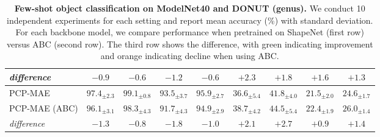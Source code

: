 \begin{table}
\begin{center}
\begin{tabular}{l|cccc|cccc}
\textit{difference} & \cellcolor{orange!25}$-0.9$ & \cellcolor{orange!25}$-0.6$ & \cellcolor{orange!25}$-1.2$ & \cellcolor{orange!25}$-0.6$ & \cellcolor{green!25}$+2.3$ & \cellcolor{green!25}$+1.8$ & \cellcolor{green!25}$+1.6$ & \cellcolor{green!25}$+1.3$ \\
\midrule
PCP-MAE~\cite{pcpmae} & $97.4_{\pm 2.3}$ & $99.1_{\pm 0.8}$ & $93.5_{\pm 3.7}$ & $95.9_{\pm 2.7}$ & $36.6_{\pm 5.4}$ & $41.8_{\pm 4.0}$ & $21.5_{\pm 2.0}$ & $24.6_{\pm 1.7}$\\
PCP-MAE (ABC) & $96.1_{\pm 3.1}$ & $98.3_{\pm 4.3}$ & $91.7_{\pm 4.3}$ & $94.9_{\pm 2.9}$ & $38.7_{\pm 4.2}$ & $44.5_{\pm 5.4}$ & $22.4_{\pm 1.9}$ & $26.0_{\pm 1.4}$\\
\textit{difference} & \cellcolor{orange!25}$-1.3$ & \cellcolor{orange!25}$-0.8$ & \cellcolor{orange!25}$-1.8$ & \cellcolor{orange!25}$-1.0$ & \cellcolor{green!25}$+2.1$ & \cellcolor{green!25}$+2.7$ & \cellcolor{green!25}$+0.9$ & \cellcolor{green!25}$+1.4$ \\

\bottomrule
\end{tabular}
\caption{{\bf Few-shot object classification on ModelNet40 and DONUT (genus).} We conduct 10 independent experiments for each setting and report mean accuracy (\%) with standard deviation. For each backbone model, we compare performance when pretrained on ShapeNet (first row) versus ABC (second row). The third row shows the difference, with green indicating improvement and orange indicating decline when using ABC.}
\setlength\tabcolsep{2pt}
\label{tb:few}
\end{center}

\end{table}